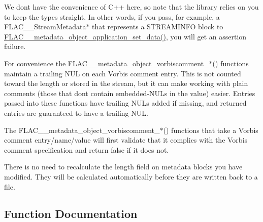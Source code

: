We don\textquotesingle{}t have the convenience of C++ here, so note that the library relies on you to keep the types straight. In other words, if you pass, for example, a F\+L\+A\+C\+\_\+\+\_\+\+Stream\+Metadata$\ast$ that represents a S\+T\+R\+E\+A\+M\+I\+N\+FO block to \hyperlink{group__flac__metadata__object_ga8f7fbaa68d5637e2409a053ec2ff744d}{F\+L\+A\+C\+\_\+\+\_\+metadata\+\_\+object\+\_\+application\+\_\+set\+\_\+data()}, you will get an assertion failure.

For convenience the F\+L\+A\+C\+\_\+\+\_\+metadata\+\_\+object\+\_\+vorbiscomment\+\_\+$\ast$() functions maintain a trailing N\+UL on each Vorbis comment entry. This is not counted toward the length or stored in the stream, but it can make working with plain comments (those that don\textquotesingle{}t contain embedded-\/\+N\+U\+Ls in the value) easier. Entries passed into these functions have trailing N\+U\+Ls added if missing, and returned entries are guaranteed to have a trailing N\+UL.

The F\+L\+A\+C\+\_\+\+\_\+metadata\+\_\+object\+\_\+vorbiscomment\+\_\+$\ast$() functions that take a Vorbis comment entry/name/value will first validate that it complies with the Vorbis comment specification and return false if it does not.

There is no need to recalculate the length field on metadata blocks you have modified. They will be calculated automatically before they are written back to a file. 

\subsection{Function Documentation}
\mbox{\label{group__flac__metadata__object_ga8f7fbaa68d5637e2409a053ec2ff744d}} 
